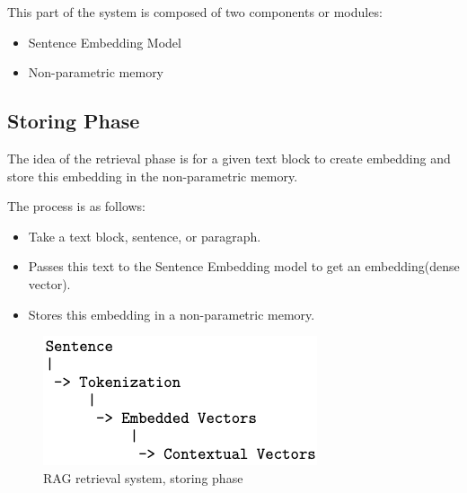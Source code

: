 \documentclass{wseas}
\begin{document}
This part of the system is composed of two components or modules:

\begin{itemize}

\item
  Sentence Embedding Model
\item
  Non-parametric memory
\end{itemize}

\subsection{Storing Phase}

The idea of the retrieval phase is for a given text block to create
embedding and store this embedding in the non-parametric memory.

The process is as follows:

\begin{itemize}
\item
  \begin{enumerate}
    Take a text block, sentence, or paragraph.
  \end{enumerate}
\item
  \begin{enumerate}
    Passes this text to the Sentence Embedding model to get an
    embedding(dense vector).
  \end{enumerate}
\item
  \begin{enumerate}
    Stores this embedding in a non-parametric memory.
  \end{enumerate}
\end{itemize}

\begin{figure}[htbp]
  \centering
  \includegraphics[width=\linewidth]{resources/v1/retrievalSystemStoringPhase.png}
  \caption{RAG retrieval system, storing phase}
  \label{fig:retrieval_system_storing_phase_figure}
\end{figure}
\end{document}

